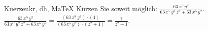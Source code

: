 \begin{MAufgabe}{Kuerzen}{kr, dh, MaTeX}
K\"urzen Sie soweit m\"oglich: $\frac{63\, x^5\, y^2}{63\, x^5\, y^2\, z^2 + 63\, x^5\, y^2}$.\\ 
\ifLsg\MLoesung
\quad $\frac{63\, x^5\, y^2}{63\, x^5\, y^2\, z^2 + 63\, x^5\, y^2}=\frac{(63\, x^5\, y^2)\cdot(1)}{(63\, x^5\, y^2)\cdot(z^2 + 1)}=\frac{1}{z^2 + 1}$.\else\relax\fi
 \end{MAufgabe}